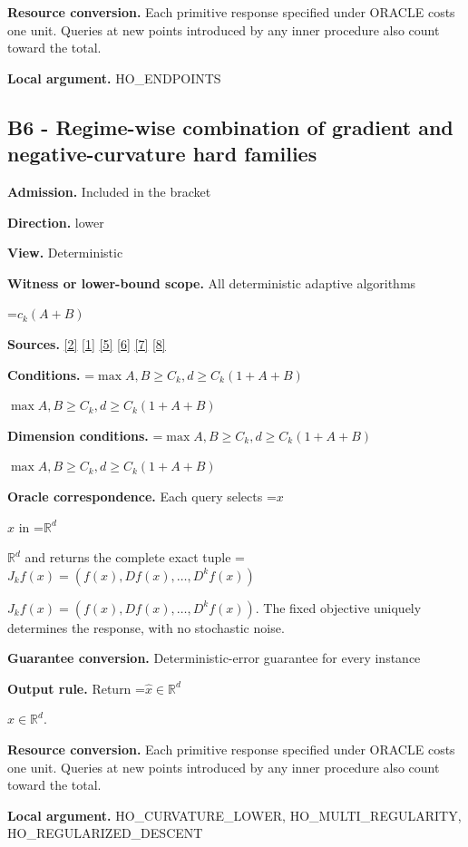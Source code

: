 \documentclass[10pt,a4paper]{article}
\newcommand{\AtlasMath}[1]{\par\begingroup\centering\setbox0=\hbox{$\displaystyle #1$}\ifdim\wd0>1.4\linewidth\typeout{ATLAS WIDE FORMULA: \the\wd0}\fi\ifdim\wd0>\linewidth\resizebox{\linewidth}{!}{\box0}\else\box0\fi\par\endgroup}
\newcommand{\AtlasInlineMath}[1]{\begingroup\setbox0=\hbox{$#1$}\ifdim\wd0>.4\linewidth\endgroup\AtlasMath{#1}\else\endgroup$#1$\fi}
\begin{document}
\textbf{Resource conversion.} Each primitive response specified under ORACLE costs one unit. Queries at new points introduced by any inner procedure also count toward the total.

\textbf{Local argument.} HO\_\allowbreak{}ENDPOINTS

\subsection{B6 - Regime-wise combination of gradient and negative-curvature hard families}
\textbf{Admission.} Included in the bracket

\textbf{Direction.} lower

\textbf{View.} Deterministic

\textbf{Witness or lower-bound scope.} All deterministic adaptive algorithms

\AtlasMath{c_k(A+B)}
\textbf{Sources.} \href{https://arxiv.org/abs/1710.11606}{[2]} \href{https://proceedings.mlr.press/v125/arjevani20a/arjevani20a.pdf}{[1]} \href{https://proceedings.mlr.press/v125/arjevani20a/arjevani20a.pdf}{[5]} \href{https://arxiv.org/abs/2610.16832}{[6]} \href{https://arxiv.org/abs/1710.11606v3}{[7]} \href{https://optimization-online.org/wp-content/uploads/2015/06/4970.pdf}{[8]}

\textbf{Conditions.} \AtlasInlineMath{\max{A,B}\ge C_k,d\ge C_k(1+A+B)}

\textbf{Dimension conditions.} \AtlasInlineMath{\max{A,B}\ge C_k,d\ge C_k(1+A+B)}

\textbf{Oracle correspondence.} Each query selects \AtlasInlineMath{x} in \AtlasInlineMath{\mathbb{R}^d} and returns the complete exact tuple \AtlasInlineMath{J_{k}f(x)=(f(x),Df(x),\ldots,D^{k}f(x))}. The fixed objective uniquely determines the response, with no stochastic noise.

\textbf{Guarantee conversion.} Deterministic-error guarantee for every instance

\textbf{Output rule.} Return \AtlasInlineMath{\widehat{x}\in \mathbb{R}^d}.

\textbf{Resource conversion.} Each primitive response specified under ORACLE costs one unit. Queries at new points introduced by any inner procedure also count toward the total.

\textbf{Local argument.} HO\_\allowbreak{}CURVATURE\_\allowbreak{}LOWER, HO\_\allowbreak{}MULTI\_\allowbreak{}REGULARITY, HO\_\allowbreak{}REGULARIZED\_\allowbreak{}DESCENT
\end{document}
